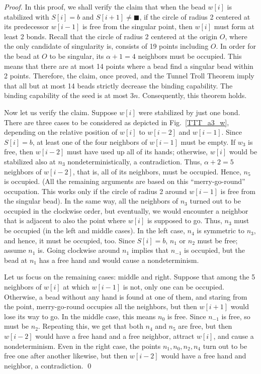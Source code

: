 \begin{proof}
In this proof, we shall verify the claim that when the bead $w[i]$ is stabilized with $S[i] = b$ and $S[i+1] \neq \blacksquare$, if the circle of radius 2 centered at its predecessor $w[i-1]$ is free from the singular point, then $w[i]$ must form at least 2 bonds. 
Recall that the circle of radius 2 centered at the origin $O$, where the only candidate of singularity is, consists of 19 points including $O$. 
In order for the bead at $O$ to be singular, its $\alpha+1 = 4$ neighbors must be occupied. 
This means that there are at most 14 points where a bead find a singular bead within 2 points. 
Therefore, the claim, once proved, and the Tunnel Troll Theorem imply that all but at most 14 beads strictly decrease the binding capability. 
The binding capability of the seed is at most $3n$. 
Consequently, this theorem holds. 

Now let us verify the claim. 
Suppose $w[i]$ were stabilized by just one bond. 
There are three cases to be considered as depicted in Fig.~\ref{TTT_a3_w}, depending on the relative position of $w[i]$ to $w[i-2]$ and $w[i-1]$. 
Since $S[i] = b$, at least one of the four neighbors of $w[i-1]$ must be empty. 
If $w_3$ is free, then $w[i-2]$ must have used up all of its hands; otherwise, $w[i]$ would be stabilized also at $n_3$ nondeterministically, a contradiction. 
Thus, $\alpha + 2 = 5$ neighbors of $w[i-2]$, that is, all of its neighbors, must be occupied. 
Hence, $n_5$ is occupied. 
(All the remaining arguments are based on this ``merry-go-round'' occupation. This works only if the circle of radius 2 around $w[i-1]$ is free from the singular bead). 
In the same way, all the neighbors of $n_3$ turned out to be occupied in the clockwise order, but eventually, we would encounter a neighbor that is adjacent to also the point where $w[i]$ is supposed to go. 
Thus, $n_3$ must be occupied (in the left and middle cases). 
In the left case, $n_4$ is symmetric to $n_3$, and hence, it must be occupied, too. 
Since $S[i] = b$, $n_1$ or $n_2$ must be free; assume $n_1$ is. 
Going clockwise around $n_1$ implies that $n_{-1}$ is occupied, but the bead at $n_1$ has a free hand and would cause a nondeterminism. 

Let us focus on the remaining cases: middle and right. 
Suppose that among the 5 neighbors of $w[i]$ at which $w[i-1]$ is not, only one can be occupied. 
Otherwise, a bead without any hand is found at one of them, and staring from the point, merry-go-round occupies all the neighbors, but then $w[i+1]$ would lose its way to go. 
In the middle case, this means $n_0$ is free. 
Since $n_{-1}$ is free, so must be $n_2$. 
Repeating this, we get that both $n_4$ and $n_5$ are free, but then $w[i-2]$ would have a free hand and a free neighbor, attract $w[i]$, and cause a nondeterminism. 
Even in the right case, the points $n_1, n_0, n_2, n_4$ turn out to be free one after another likewise, but then $w[i-2]$ would have a free hand and neighbor, a contradiction. 
\qed

\end{proof}

